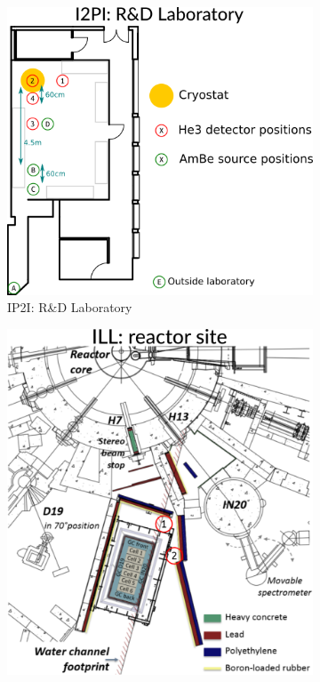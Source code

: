 \begin{figure}
\centering
\begin{subfigure}{.5\textwidth}
  \centering
  \includegraphics[width=\linewidth]{Figures/Neutron/scheme_ip2i.png}
  \caption{IP2I: R\&D Laboratory}
  \label{fig:scheme-ip2i}
\end{subfigure}%
\begin{subfigure}{0.5\textwidth}
  \centering
  \includegraphics[width=\linewidth]{Figures/Neutron/scheme_ill.png}

\end{subfigure}
\end{figure}

